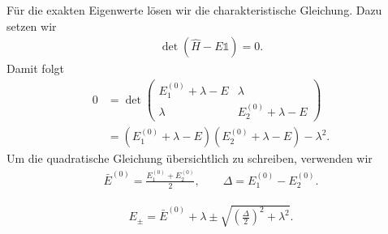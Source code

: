 \documentclass[11pt,a4paper]{scrartcl}
\newcommand{\op}[1]{\hat{#1}}
\begin{document}
\begin{enumerate}[label=(\alph*)]
\begin{calculationbox}
            \begin{calculationbox}[title=Exakte Eigenwerte]
                Für die exakten Eigenwerte lösen wir die charakteristische Gleichung. Dazu setzen wir
                \begin{align*}
                    \det(\op H-E\mathbb 1)=0.
                \end{align*}
                Damit folgt
                \begin{align*}
                    0
                    &=
                    \det
                    \begin{pmatrix}
                        E_1^{(0)}+\lambda-E & \lambda\\
                        \lambda & E_2^{(0)}+\lambda-E
                    \end{pmatrix}\\
                    &=
                    (E_1^{(0)}+\lambda-E)(E_2^{(0)}+\lambda-E)-\lambda^2.
                \end{align*}
                Um die quadratische Gleichung übersichtlich zu schreiben, verwenden wir
                \begin{align*}
                    \bar E^{(0)}=\frac{E_1^{(0)}+E_2^{(0)}}{2},
                    \qquad
                    \Delta=E_1^{(0)}-E_2^{(0)}.
                \end{align*}

                \begin{solutionbox}[title=Exakte Eigenwerte]
                    \begin{align*}
                        E_{\pm}
                        =
                        \bar E^{(0)}+\lambda
                        \pm
                        \sqrt{\left(\frac{\Delta}{2}\right)^2+\lambda^2}.
                    \end{align*}
                \end{solutionbox}
            \end{calculationbox}


\end{calculationbox}
\end{enumerate}
\end{document}
